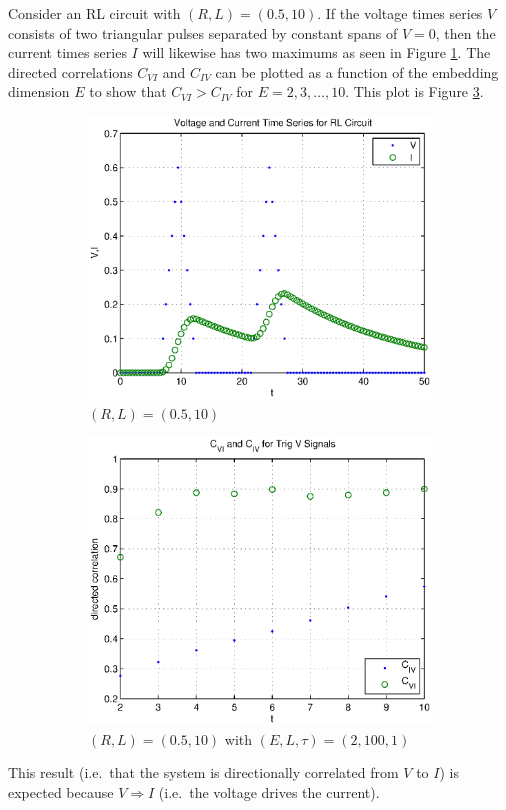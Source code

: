 \documentclass[a4paper,11pt]{article}
\begin{document}
Consider an RL circuit with $(R,L) = (0.5,10)$.  If the voltage times series $V$ consists of two triangular pulses separated by constant spans of $V=0$, then the current times series $I$ will likewise has two maximums as seen in Figure \ref{fig:RL_trigsignals}.  The directed correlations $C_{VI}$ and $C_{IV}$ can be plotted as a function of the embedding dimension $E$ to show that $C_{VI}>C_{IV}$ for $E=2,3,\ldots,10$.  This plot is Figure \ref{fig:RL_trigsignalsCCM}.
\begin{figure}[h!t]
\centering
\begin{subfigure}[b]{0.4\textwidth}
\label{fig:RL_trigsignals}
\includegraphics[scale=0.55]{graphics/RL_trigsignals.eps}
\caption{$(R,L) = (0.5,10)$}
\end{subfigure}
\begin{subfigure}[b]{0.4\textwidth}
\label{fig:RL_trigsignalsCCM}
\includegraphics[scale=0.55]{graphics/RL_trigsignalsCCM.eps}
\caption{$(R,L) = (0.5,10)$ with $\left(E,L,\tau\right)=\left(2,100,1\right)$}
\end{subfigure}
\caption{}
\end{figure}
This result (i.e.\ that the system is directionally correlated from $V$ to $I$) is expected because $V\Rightarrow I$ (i.e.\ the voltage drives the current).
\end{document}
